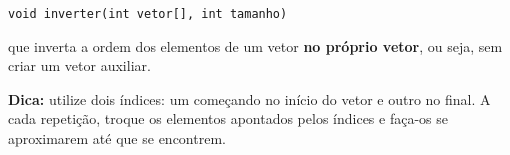 \begin{exercicio}
\begin{center}
\texttt{void inverter(int vetor[], int tamanho)}
\end{center}

que inverta a ordem dos elementos de um vetor \textbf{no próprio vetor}, ou seja, sem criar um vetor auxiliar.

\textbf{Dica:} utilize dois índices: um começando no início do vetor e outro no final. A cada repetição, troque os elementos apontados pelos índices e faça-os se aproximarem até que se encontrem.

\end{exercicio}
